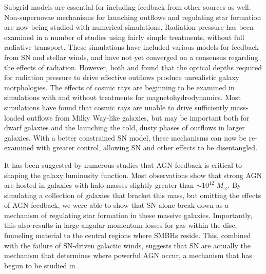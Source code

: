 Subgrid models are essential for including feedback from other sources as well.
Non-supernovae mechanisms for launching outflows and regulating star formation
are now being studied with numerical simulations.  Radiation pressure has been
examined in a number of studies \citep{Hopkins2014,Roskar2014,Agertz2015} using
fairly simple treatments, without full radiative transport.  These simulations
have included various models for feedback from SN and stellar winds, and have
not yet converged on a consensus regarding the effects of radiation.  However,
both \citet{Roskar2014} and \citet{Agertz2015} found that the optical depths
required for radiation pressure to drive effective outflows produce unrealistic
galaxy morphologies.  The effects of cosmic rays are beginning to be examined in
simulations with \citep{Girichidis2015} and without
\citep{Jubelgas2008,Booth2013} treatments for magnetohydrodynamics.  Most
simulations have found that cosmic rays are unable to drive sufficiently
mass-loaded outflows from Milky Way-like galaxies, but may be important both for
dwarf galaxies and the launching the cold, dusty phases of outflows in larger
galaxies.  With a better constrained SN model, these mechanisms can now be
re-examined with greater control, allowing SN and other effects to be
disentangled.

It has been suggested by numerous studies \citep{Benson2003,Bower2006} that AGN
feedback is critical to shaping the galaxy luminosity function.  Most
observations \citep{Kauffmann2003b} show that strong AGN are hosted in galaxies
with halo masses slightly greater than $\sim10^{12}\;M_\odot$.  By simulating a
collection of galaxies that bracket this mass, but omitting the effects of AGN
feedback, we were able to show that SN alone break down as a mechanism of
regulating star formation in these massive galaxies.  Importantly, this also
results in large angular momentum losses for gas within the disc, funneling
material to the central regions where SMBHs reside.  This, combined with the
failure of SN-driven galactic winds, suggests that SN are actually the mechanism
that determines where powerful AGN occur, a mechanism that has begun to be studied in
\citet{Bower2016}.

